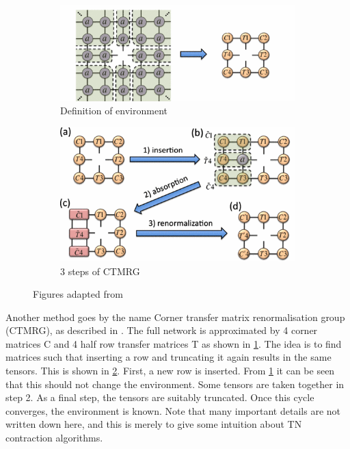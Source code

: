 \begin{figure}[h!]
    \centering
    \begin{subfigure}[b]{0.8\textwidth}
        \centering
        \includegraphics[width=\textwidth]{Figuren/tnalgs/CTMRG_Def.png   }
        \caption{Definition of environment}
        \label{fig:tnalgs:ctmrg:a}
    \end{subfigure}

    \begin{subfigure}[b]{0.7\textwidth}
        \centering
        \includegraphics[width=\textwidth]{Figuren/tnalgs/CTMRG.png   }
        \caption{3 steps of CTMRG}
        \label{fig:tnalgs:ctmrg:b}
    \end{subfigure}
    \caption{  Figures adapted from \cite{orus} }
    \label{fig:tnalgs:ctmrg}
\end{figure}

Another method goes by the name Corner transfer matrix renormalisation group (CTMRG), as described in \cite{orus}. The full network is approximated by 4 corner matrices C and 4 half row transfer matrices T as shown in \cref{fig:tnalgs:ctmrg:a}. The idea is to find matrices such that inserting a row and truncating it again results in the same tensors. This is shown in \cref{fig:tnalgs:ctmrg:b}. First, a new row is inserted. From \cref{fig:tnalgs:ctmrg:a} it can be seen that this should not change the environment. Some tensors are taken together in step 2. As a final step, the tensors are suitably truncated. Once this cycle converges, the environment is known. Note that many important details are not written down here, and this is merely to give some intuition about \Gls{TN} contraction algorithms.


